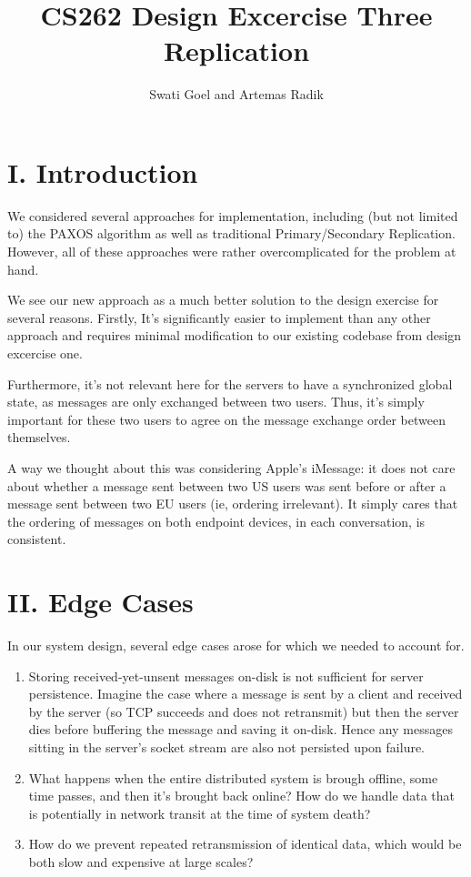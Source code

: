 \documentclass[
	a4paper, %
	10pt, %
	unnumberedsections, %
	twoside, %
]{LTJournalArticle}
\title{CS262 Design Excercise Three \\ Replication} %
\author{%
	Swati Goel and Artemas Radik
}
\begin{document}
\maketitle %


\section{I. Introduction}

We considered several approaches for implementation, including (but not limited to) the PAXOS algorithm as well as traditional Primary/Secondary Replication. However, all of these approaches were rather overcomplicated for the problem at hand.

\smallskip
We see our new approach as a much better solution to the design exercise for several reasons. Firstly, It's significantly easier to implement than any other approach and requires minimal modification to our existing codebase from design excercise one.

\smallskip
Furthermore, it's not relevant here for the servers to have a synchronized global state, as messages are only exchanged between two users. Thus, it's simply important for these two users to agree on the message exchange order between themselves. 

\smallskip
A way we thought about this was considering Apple's iMessage: it does not care about whether a message sent between two US users was sent before or after a message sent between two EU users (ie, ordering irrelevant). It simply cares that the ordering of messages on both endpoint devices, in each conversation, is consistent.


\section{II. Edge Cases}
In our system design, several edge cases arose for which we needed to account for.
\begin{enumerate}
	\item Storing received-yet-unsent messages on-disk is not sufficient for server persistence. Imagine the case where a message is sent by a client and received by the server (so TCP succeeds and does not retransmit) but then the server dies before buffering the message and saving it on-disk. Hence any messages sitting in the server's socket stream are also not persisted upon failure.
	\item What happens when the entire distributed system is brough offline, some time passes, and then it's brought back online? How do we handle data that is potentially in network transit at the time of system death?
	\item How do we prevent repeated retransmission of identical data, which would be both slow and expensive at large scales?
\end{enumerate}
\end{document}

